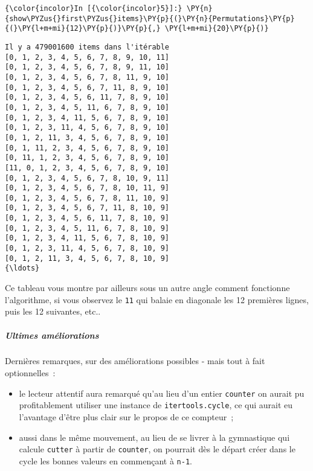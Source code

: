     \begin{Verbatim}[commandchars=\\\{\}]
{\color{incolor}In [{\color{incolor}5}]:} \PY{n}{show\PYZus{}first\PYZus{}items}\PY{p}{(}\PY{n}{Permutations}\PY{p}{(}\PY{l+m+mi}{12}\PY{p}{)}\PY{p}{,} \PY{l+m+mi}{20}\PY{p}{)}
\end{Verbatim}


    \begin{Verbatim}[commandchars=\\\{\}]
Il y a 479001600 items dans l'itérable
[0, 1, 2, 3, 4, 5, 6, 7, 8, 9, 10, 11]
[0, 1, 2, 3, 4, 5, 6, 7, 8, 9, 11, 10]
[0, 1, 2, 3, 4, 5, 6, 7, 8, 11, 9, 10]
[0, 1, 2, 3, 4, 5, 6, 7, 11, 8, 9, 10]
[0, 1, 2, 3, 4, 5, 6, 11, 7, 8, 9, 10]
[0, 1, 2, 3, 4, 5, 11, 6, 7, 8, 9, 10]
[0, 1, 2, 3, 4, 11, 5, 6, 7, 8, 9, 10]
[0, 1, 2, 3, 11, 4, 5, 6, 7, 8, 9, 10]
[0, 1, 2, 11, 3, 4, 5, 6, 7, 8, 9, 10]
[0, 1, 11, 2, 3, 4, 5, 6, 7, 8, 9, 10]
[0, 11, 1, 2, 3, 4, 5, 6, 7, 8, 9, 10]
[11, 0, 1, 2, 3, 4, 5, 6, 7, 8, 9, 10]
[0, 1, 2, 3, 4, 5, 6, 7, 8, 10, 9, 11]
[0, 1, 2, 3, 4, 5, 6, 7, 8, 10, 11, 9]
[0, 1, 2, 3, 4, 5, 6, 7, 8, 11, 10, 9]
[0, 1, 2, 3, 4, 5, 6, 7, 11, 8, 10, 9]
[0, 1, 2, 3, 4, 5, 6, 11, 7, 8, 10, 9]
[0, 1, 2, 3, 4, 5, 11, 6, 7, 8, 10, 9]
[0, 1, 2, 3, 4, 11, 5, 6, 7, 8, 10, 9]
[0, 1, 2, 3, 11, 4, 5, 6, 7, 8, 10, 9]
[0, 1, 2, 11, 3, 4, 5, 6, 7, 8, 10, 9]
{\ldots}

    \end{Verbatim}

    Ce tableau vous montre par ailleurs sous un autre angle comment
fonctionne l'algorithme, si vous observez le \texttt{11} qui balaie en
diagonale les 12 premières lignes, puis les 12 suivantes, etc..

    \hypertarget{ultimes-amuxe9liorations}{%
\subparagraph{Ultimes améliorations}\label{ultimes-amuxe9liorations}}

    Dernières remarques, sur des améliorations possibles - mais tout à fait
optionnelles~:

\begin{itemize}
\tightlist
\item
  le lecteur attentif aura remarqué qu'au lieu d'un entier
  \texttt{counter} on aurait pu profitablement utiliser une instance de
  \texttt{itertools.cycle}, ce qui aurait eu l'avantage d'être plus
  clair sur le propos de ce compteur~;
\item
  aussi dans le même mouvement, au lieu de se livrer à la gymnastique
  qui calcule \texttt{cutter} à partir de \texttt{counter}, on pourrait
  dès le départ créer dans le cycle les bonnes valeurs en commençant à
  \texttt{n-1}.
\end{itemize}

